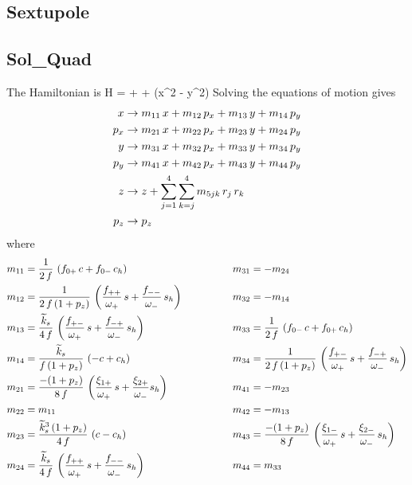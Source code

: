 \documentclass{book}
\begin{document}
\subsection{Sextupole}

\subsection{Sol\_Quad}

The Hamiltonian is
\Begineq
  H =  + 
   +  (x^2 - y^2)
\Endeq
Solving the equations of motion gives
\begin{align}
  x   &\rightarrow m_{11} \, x + m_{12} \, p_x + m_{13} \, y + m_{14} \, p_y \nonumber \\
  p_x &\rightarrow m_{21} \, x + m_{22} \, p_x + m_{23} \, y + m_{24} \, p_y \nonumber \\
  y   &\rightarrow m_{31} \, x + m_{32} \, p_x + m_{33} \, y + m_{34} \, p_y \nonumber \\
  p_y &\rightarrow m_{41} \, x + m_{42} \, p_x + m_{43} \, y + m_{44} \, p_y \nonumber \\
  z   &\rightarrow z + \sum_{j = 1}^4 \sum_{k = j}^4 m_{5jk} \, r_j \, r_k  \nonumber \\
  p_z &\rightarrow p_z \nonumber
\end{align}
where
\begin{alignat}{2}
  m_{11} &= \frac{1}{2 \, f} \, \left( f_{0+} \, c + f_{0-} \, c_h \right) & \qquad \qquad
  m_{31} &= -m_{24} \nonumber \\
  m_{12} &= \frac{1}{2 \, f \, (1 + p_z)} \, 
            \left( \frac{f_{++}}{\omega_+} \,  s + \frac{f_{--}}{\omega_-} \, s_h \right) & \qquad \qquad
  m_{32} &= -m_{14} \nonumber \\
  m_{13} &= \frac{\widetilde k_s}{4 \, f} \, 
            \left( \frac{f_{+-}}{\omega_+} \, s +\frac{f_{-+}}{\omega_-} \, s_h \right) & \qquad \qquad
  m_{33} &= \frac{1}{2 \, f} \, \left( f_{0-} \, c + f_{0+} \, c_h \right) \nonumber \\
  m_{14} &= \frac{\widetilde k_s}{f \, (1 + p_z)} \, \left( -c + c_h \right) & \qquad \qquad
  m_{34} &= \frac{1}{2 \, f \, (1 + p_z)} \, 
            \left( \frac{f_{+-}}{\omega_+} \, s + \frac{f_{-+}}{\omega_-} \, s_h \right) \nonumber \\
  m_{21} &= \frac{-(1 + p_z)}{8 \, f} \, 
            \left( \frac{\xi_{1+}}{\omega_+} \, s + \frac{\xi_{2+}}{\omega_-} s_h \right) & \qquad \qquad
  m_{41} &= -m_{23} \nonumber \\
  m_{22} &= m_{11} & \qquad \qquad
  m_{42} &= -m_{13} \nonumber \\
  m_{23} &= \frac{\widetilde k_s^3 \, (1 + p_z)}{4 \, f} \, \left( c - c_h \right) & \qquad \qquad
  m_{43} &= \frac{-(1 + p_z)}{8 \, f} \, 
            \left( \frac{\xi_{1-}}{\omega_+} \, s + \frac{\xi_{2-}}{\omega_-} \, s_h \right) \nonumber \\
  m_{24} &= \frac{\widetilde k_s}{4 \, f} \, 
            \left( \frac{f_{++}}{\omega_+} \, s + \frac{f_{--}}{\omega_-} \, s_h \right) & \qquad \qquad
  m_{44} &= m_{33} \nonumber
\end{alignat}
\end{document}
